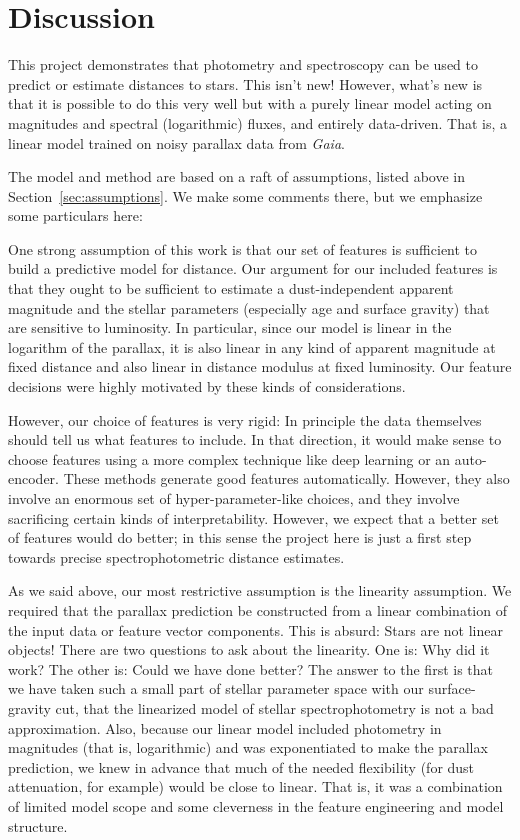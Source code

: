\documentclass[modern]{aastex62}
\newcommand{\sectionname}{Section}
\newcommand{\project}[1]{\textsl{#1}}
\newcommand{\gaia}{\project{Gaia}}
\begin{document}
\section{Discussion}

This project demonstrates that photometry and spectroscopy can be used to predict
or estimate distances to stars.
This isn't new!
However, what's new is that it is possible to do this very well but with a purely
linear model acting on magnitudes and spectral (logarithmic) fluxes, and entirely
data-driven.
That is, a linear model trained on noisy parallax data from \gaia.

The model and method are based on a raft of assumptions, listed above
in \sectionname~\ref{sec:assumptions}.
We make some comments there, but we emphasize some particulars here:

One strong assumption of this work is that our set of features is sufficient to
build a predictive model for distance.
Our argument for our included features is that they ought to be sufficient to
estimate a dust-independent apparent magnitude and the stellar parameters (especially
age and surface gravity) that are sensitive to luminosity.
In particular, since our model is linear in the logarithm of the parallax, it is
also linear in any kind of apparent magnitude at fixed distance and also linear
in distance modulus at fixed luminosity.
Our feature decisions were highly motivated by these kinds of considerations.

However, our choice of features is very rigid:
In principle the data themselves should tell us what features to include.
In that direction, it would make sense to choose features using a more complex
technique like deep learning or an auto-encoder.
These methods generate good features automatically.
However, they also involve an enormous set of hyper-parameter-like choices,
and they involve sacrificing certain kinds of interpretability.
However, we expect that a better set of features would do better; in this sense
the project here is just a first step towards precise spectrophotometric distance
estimates.

As we said above, our most restrictive assumption is the linearity assumption.
We required that the parallax prediction be constructed from a linear combination
of the input data or feature vector components.
This is absurd: Stars are not linear objects!
There are two questions to ask about the linearity.
One is: Why did it work? The other is: Could we have done better?
The answer to the first is that we have taken such a small part of stellar parameter
space with our surface-gravity cut, that the linearized model of stellar
spectrophotometry is not a bad approximation.
Also, because our linear model included photometry in magnitudes (that is, logarithmic)
and was exponentiated to make the parallax prediction, we knew in advance that much
of the needed flexibility (for dust attenuation, for example) would be close to
linear.
That is, it was a combination of limited model scope and some cleverness in the
feature engineering and model structure.
\end{document}
